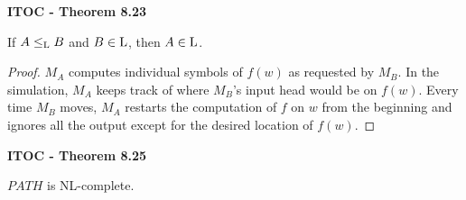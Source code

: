 \label{theo:8.23}
\begin{shaded}
\textbf{ITOC - Theorem 8.23}

\medskip
If $A \leq_{\text{L}} B$ and $B \in \text{L}$, then $A\in \text{L}$.
\end{shaded}

\begin{mdframed}
\begin{proof}
$M_A$ computes individual symbols of $f(w)$ as requested by $M_B$. In the simulation, $M_A$ keeps track of where $M_B$'s input head would be on $f(w)$. Every time $M_B$ moves, $M_A$ restarts the computation of $f$ on $w$ from the beginning and ignores all the output except for the desired location of $f(w)$. 
\end{proof}
\end{mdframed}

\label{theo:8.25}
\label{lang:PATH_NLC}
\begin{shaded}
\textbf{ITOC - Theorem 8.25}

\medskip
$PATH$ is NL-complete.
\end{shaded}

